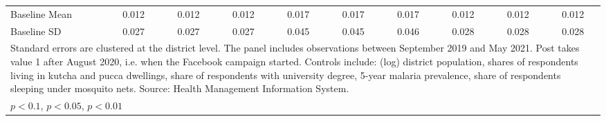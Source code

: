 {\begin{tabular}{l*{9}{c}}
Baseline Mean   &    0.012         &    0.012         &    0.012         &    0.017         &    0.017         &    0.017         &    0.012         &    0.012         &    0.012         \\
Baseline SD     &    0.027         &    0.027         &    0.027         &    0.045         &    0.045         &    0.046         &    0.028         &    0.028         &    0.028         \\
\hline\hline
\multicolumn{10}{l}{\footnotesize Standard errors are clustered at the district level. The panel includes observations between September 2019 and May 2021. Post takes value 1 after August 2020, i.e. when the Facebook campaign started. Controls include: (log) district population, shares of respondents living in kutcha and pucca dwellings, share of respondents with university degree, 5-year malaria prevalence, share of respondents sleeping under mosquito nets. Source: Health Management Information System.}\\
\multicolumn{10}{l}{\footnotesize \sym{*} \(p<0.1\), \sym{**} \(p<0.05\), \sym{***} \(p<0.01\)}\\
\end{tabular}
}
